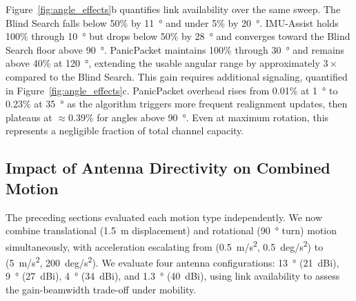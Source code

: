 \documentclass[fleqn,10pt]{wlscirep}
\begin{document}
Figure~\ref{fig:angle_effects}b quantifies link availability over the same sweep. The Blind Search falls below 50\% by \SI{11}{\degree} and under 5\% by \SI{20}{\degree}. IMU-Assist holds 100\% through \SI{10}{\degree} but drops below 50\% by \SI{28}{\degree} and converges toward the Blind Search floor above \SI{90}{\degree}. PanicPacket maintains 100\% through \SI{30}{\degree} and remains above 40\% at \SI{120}{\degree}, extending the usable angular range by approximately $3\times$ compared to the Blind Search. This gain requires additional signaling, quantified in Figure~\ref{fig:angle_effects}c. PanicPacket overhead rises from 0.01\% at \SI{1}{\degree} to 0.23\% at \SI{35}{\degree} as the algorithm triggers more frequent realignment updates, then plateaus at $\approx$0.39\% for angles above \SI{90}{\degree}. Even at maximum rotation, this represents a negligible fraction of total channel capacity.

\subsection*{Impact of Antenna Directivity on Combined Motion}

The preceding sections evaluated each motion type independently. We now combine translational (\SI{1.5}{m} displacement) and rotational (\SI{90}{\degree} turn) motion simultaneously, with acceleration escalating from (\SI{0.5}{m/s^2}, \SI{0.5}{deg/s^2}) to (\SI{5}{m/s^2}, \SI{200}{deg/s^2}). We evaluate four antenna configurations: \SI{13}{\degree} (\SI{21}{dBi}), \SI{9}{\degree} (\SI{27}{dBi}), \SI{4}{\degree} (\SI{34}{dBi}), and \SI{1.3}{\degree} (\SI{40}{dBi}), using link availability to assess the gain-beamwidth trade-off under mobility.
\end{document}
